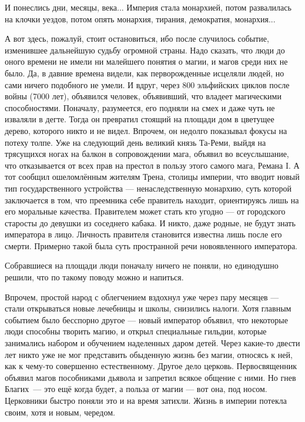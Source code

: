 \documentclass[12pt,a4paper]{book}
\begin{document}
И понеслись дни, месяцы, века... Империя стала монархией, потом развалилась на клочки уездов, потом опять монархия, тирания, демократия, монархия...

А вот здесь, пожалуй, стоит остановиться, ибо после случилось событие, изменившее дальнейшую судьбу огромной страны. Надо сказать, что люди до оного времени не имели ни малейшего понятия о магии, и магов среди них не было. Да, в давние времена видели, как перворожденные исцеляли людей, но сами ничего подобного не умели. И вдруг, через 800 эльфийских циклов после войны (7000 лет), объявился человек, объявивший, что владеет магическими способностями. Поначалу, разумеется, его подняли на смех и даже чуть не изваляли в дегте. Тогда он превратил стоящий на площади дом в цветущее дерево, которого никто и не видел. Впрочем, он недолго показывал фокусы на потеху толпе. Уже на следующий день великий князь Та-Реми, выйдя на трясущихся ногах на балкон в сопровождении мага, объявил во всеуслышание, что отказывается от всех прав на престол в пользу этого самого мага, Ремана I. А тот сообщил ошеломлённым жителям Трена, столицы империи, что вводит новый тип государственного устройства --- ненаследственную монархию, суть которой заключается в том, что преемника себе правитель находит, ориентируясь лишь на его моральные качества. Правителем может стать кто угодно --- от городского старосты до девушки из соседнего кабака. И никто, даже родные, не будут знать императора в лицо. Личность правителя становится известна лишь после его смерти. Примерно такой была суть пространной речи новоявленного императора.

Собравшиеся на площади люди поначалу ничего не поняли, но единодушно решили, что по такому поводу можно и напиться.

Впрочем, простой народ с облегчением вздохнул уже через пару месяцев --- стали открываться новые лечебницы и школы, снизились налоги. Хотя главным событием было бесспорно другое --- новый император объявил, что некоторые люди способны творить магию, и открыл специальные гильдии, которые занимались набором и обучением наделенных даром детей. Через какие-то двести лет никто уже не мог представить обыденную жизнь без магии, относясь к ней, как к чему-то совершенно естественному. Другое дело церковь. Первосвященник объявил магов пособниками дьявола и запретил всякое общение с ними. Но гнев \mbox{Благих ---} это ещё когда будет, а польза от магии --- вот она, под носом. Церковники быстро поняли это и на время затихли. Жизнь в империи потекла своим, хотя и новым, чередом.
\end{document}
